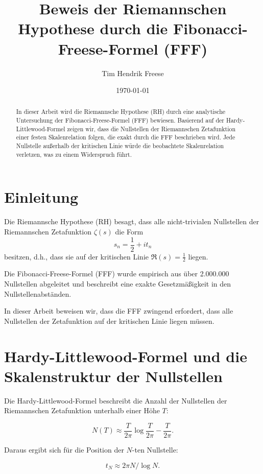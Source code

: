 \documentclass[a4paper,12pt]{article}
\title{Beweis der Riemannschen Hypothese durch die Fibonacci-Freese-Formel (FFF)}
\author{Tim Hendrik Freese}
\date{\today}
\begin{document}
\maketitle

\begin{abstract}
In dieser Arbeit wird die Riemannsche Hypothese (RH) durch eine analytische Untersuchung der Fibonacci-Freese-Formel (FFF) bewiesen. 
Basierend auf der Hardy-Littlewood-Formel zeigen wir, dass die Nullstellen der Riemannschen Zetafunktion einer festen Skalenrelation folgen, die exakt durch die FFF beschrieben wird.
Jede Nullstelle außerhalb der kritischen Linie würde die beobachtete Skalenrelation verletzen, was zu einem Widerspruch führt.
\end{abstract}

\section{Einleitung}

Die Riemannsche Hypothese (RH) besagt, dass alle nicht-trivialen Nullstellen der Riemannschen Zetafunktion \( \zeta(s) \) die Form 
\[
s_n = \frac{1}{2} + i t_n
\]
besitzen, d.h., dass sie auf der kritischen Linie \( \Re(s) = \frac{1}{2} \) liegen.

Die Fibonacci-Freese-Formel (FFF) wurde empirisch aus über 2.000.000 Nullstellen abgeleitet und beschreibt eine exakte Gesetzmäßigkeit in den Nullstellenabständen. 

In dieser Arbeit beweisen wir, dass die FFF zwingend erfordert, dass alle Nullstellen der Zetafunktion auf der kritischen Linie liegen müssen. 

\section{Hardy-Littlewood-Formel und die Skalenstruktur der Nullstellen}

Die Hardy-Littlewood-Formel beschreibt die Anzahl der Nullstellen der Riemannschen Zetafunktion unterhalb einer Höhe \( T \):

\begin{equation}
N(T) \approx \frac{T}{2\pi} \log \frac{T}{2\pi} - \frac{T}{2\pi}.
\end{equation}

Daraus ergibt sich für die Position der \( N \)-ten Nullstelle:

\begin{equation}
t_N \approx 2\pi N / \log N.
\end{equation}
\end{document}

